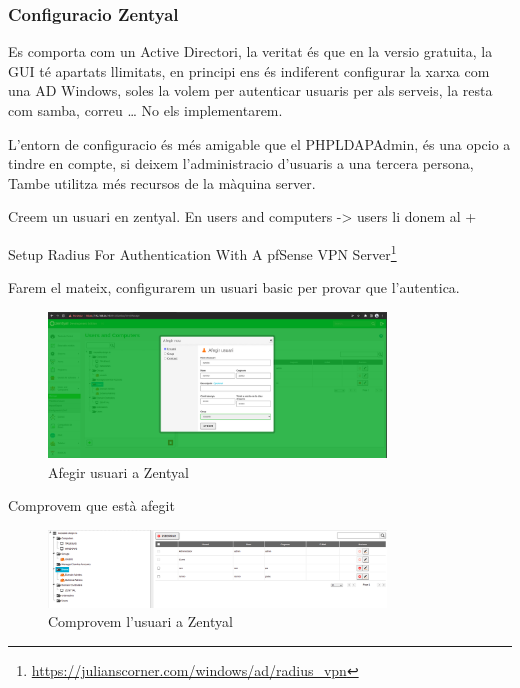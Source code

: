 \documentclass[
  10pt,
]{krantz}
\DeclareRobustCommand{\href}[2]{#2\footnote{\url{#1}}}
\begin{document}
\hypertarget{configuracio-zentyal}{%
\subsubsection{Configuracio Zentyal}\label{configuracio-zentyal}}

Es comporta com un Active Directori, la veritat és que en la versio gratuita, la GUI té apartats llimitats, en principi ens és indiferent configurar la xarxa com una AD Windows, soles la volem per autenticar usuaris per als serveis, la resta com samba, correu \ldots{} No els implementarem.

L'entorn de configuracio és més amigable que el PHPLDAPAdmin, és una opcio a tindre en compte, si deixem l'administracio d'usuaris a una tercera persona, Tambe utilitza més recursos de la màquina server.

Creem un usuari en zentyal. En users and computers -\textgreater{} users li donem al +

\href{https://julianscorner.com/windows/ad/radius_vpn}{Setup Radius For Authentication With A pfSense VPN Server}

Farem el mateix, configurarem un usuari basic per provar que l'autentica.

\begin{figure}
\centering
\includegraphics[width=0.8\textwidth,height=\textheight]{imatges/proxmox/Zentyal_usuari.png}
\caption{Afegir usuari a Zentyal}
\end{figure}

Comprovem que està afegit

\begin{figure}
\centering
\includegraphics[width=0.8\textwidth,height=\textheight]{imatges/proxmox/usuari_zentyal.png}
\caption{Comprovem l'usuari a Zentyal}
\end{figure}
\end{document}
